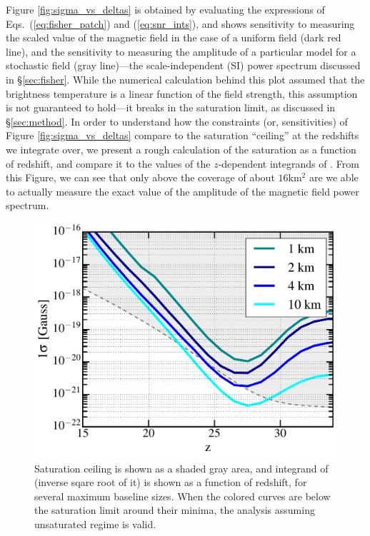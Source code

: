 Figure \ref{fig:sigma_vs_deltas} is obtained by evaluating the expressions of Eqs.~(\ref{eq:fisher_patch}) and (\ref{eq:snr_ints}), and shows sensitivity to measuring the scaled value of the magnetic field in the case of a uniform field (dark red line), and the sensitivity to measuring the amplitude of a particular model for a stochastic field (gray line)---the scale-independent (SI) power spectrum discussed in \S\ref{sec:fisher}. While the numerical calculation behind this plot assumed that the brightness temperature is a linear function of the field strength, this assumption is not guaranteed to hold---it breaks in the saturation limit, as discussed in \S\ref{sec:method}. In order to understand how the constraints (or, sensitivities) of Figure \ref{fig:sigma_vs_deltas} compare to the saturation ``ceiling'' at the redshifts we integrate over, we present a rough calculation of the saturation as a function of redshift, and compare it to the values of the $z$-dependent integrands of \eq{\ref{eq:fisher_patch}}. From this Figure, we can see that only above the coverage of about $16$km$^2$ are we able to actually measure the exact value of the amplitude of the magnetic field power spectrum.
\begin{figure}
\centering
\includegraphics[width=.35\textwidth,keepaspectratio=true]{sigmaB0_vs_z.pdf}
\caption{Saturation ceiling is shown as a shaded gray area, and integrand of \eq{\ref{eq:fisher_patch}} (inverse sqare root of it) is shown as a function of redshift, for several maximum baseline sizes.  When the colored curves are below the saturation limit around their minima, the analysis assuming unsaturated regime is valid.\label{fig:Bsat}}
\end{figure}
